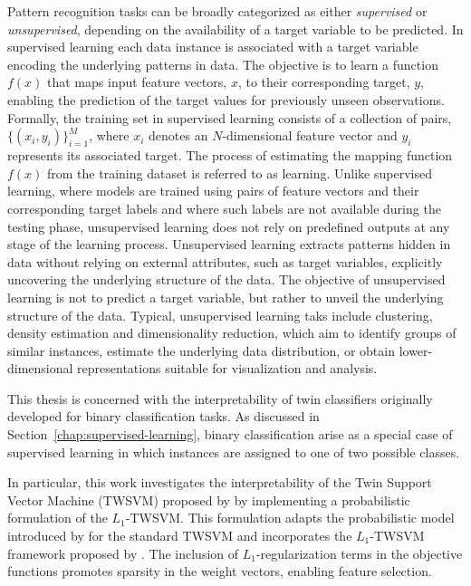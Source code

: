 \documentclass[12pt]{report} %
\begin{document}
Pattern recognition tasks can be broadly categorized as either \textit{supervised} or \textit{unsupervised}, depending on the availability of a target variable to be predicted. In supervised learning each data instance is associated with a target variable encoding the underlying patterns in data. The objective is to learn a function $f(x)$ that maps input feature vectors, $x$, to their corresponding target, $y$, enabling the prediction of the target values for previously unseen observations. Formally, the training set in supervised learning consists of a collection of pairs, $\{(x_i, y_i)\}_{i=1}^{M}$, where $x_i$ denotes an $N$-dimensional feature vector and $y_i$ represents its associated target. The process of estimating the mapping function $f(x)$ from the training dataset is referred to as learning. Unlike supervised learning, where models are trained using pairs of feature vectors and their corresponding target labels and where such labels are not available during the testing phase, unsupervised learning does not rely on predefined outputs at any stage of the learning process. Unsupervised learning extracts patterns hidden in data without relying on external attributes, such as target variables, explicitly uncovering the underlying structure of the data. The objective of unsupervised learning is not to predict a target variable, but rather to unveil the underlying structure of the data. Typical, unsupervised learning taks include clustering, density estimation and dimensionality reduction, which aim to identify groups of similar instances, estimate the underlying data distribution, or obtain lower-dimensional representations suitable for visualization and analysis.

This thesis is concerned with the interpretability of twin classifiers originally developed for binary classification tasks. As discussed in Section~\ref{chap:supervised-learning}, binary classification arise as a special case of supervised learning in which instances are assigned to one of two possible classes.

In particular, this work investigates the interpretability of the Twin Support Vector Machine (TWSVM) proposed by \cite{khemchandani2007twin} by implementing a probabilistic formulation of the $L_1$-TWSVM. This formulation adapts the probabilistic model introduced by \cite{shao2012probabilistic} for the standard TWSVM and incorporates the $L_1$-TWSVM framework proposed by \cite{bai2014novel}. The inclusion of $L_1$-regularization terms in the objective functions promotes sparsity in the weight vectors, enabling feature selection.
\end{document}
